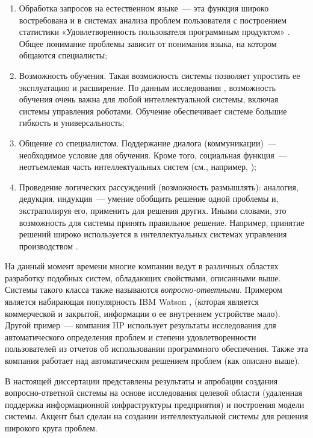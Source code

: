 \begin{enumerate}
  \item Обработка запросов на естественном языке~--- эта функция широко востребована и в системах анализа проблем пользователя с построением статистики «Удовлетворенность пользователя программным продуктом» \cite{TUTUB-1}. Общее понимание проблемы зависит от понимания языка, на котором общаются специалисты;
  \item Возможность обучения. Такая возможность системы позволяет упростить ее эксплуатацию и расширение. По данным исследования \cite{LEARN-1}, возможность обучения очень важна для любой интеллектуальной системы, включая системы управления роботами. Обучение обеспечивает системе большие гибкость и универсальность;
  \item Общение со специалистом. Поддержание диалога (коммуникации)~--- необходимое условие для обучения. Кроме того, социальная функция~--- неотъемлемая часть интеллектуальных систем (см., например, \cite{LEARN-2});
  \item Проведение логических рассуждений (возможность размышлять): аналогия, дедукция, индукция~--- умение обобщить решение одной проблемы и, экстраполируя его, применить для решения других. Иными словами, это возможность для системы принять правильное решение. Например, принятие решений широко используется в интеллектуальных системах управления производством  \cite{LEARN-3}.
\end{enumerate}

На данный момент времени многие компании ведут в различных областях разработку подобных систем, обладающих свойствами, описанными выше. Системы такого класса также называются \textit{вопросно-ответными}. Примером является набирающая популярность IBM Watson \cite{WATSON-PO}, \cite{WATSON-PTOP} (которая является коммерческой и закрытой, информации о ее внутреннем устройстве мало). Другой пример~--- компания HP использует результаты исследования \cite{TUTUB-2} для автоматического определения проблем и степени удовлетворенности пользователей из отчетов об использовании программного обеспечения. Также эта компания работает над автоматическим решением проблем (как описано выше). \par

В настоящей диссертации представлены результаты и апробации создания вопросно-ответной системы на основе исследования целевой области (удаленная поддержка информационной инфраструктуры предприятия) и построения модели системы. Акцент был сделан на создании интеллектуальной системы для решения широкого круга проблем. \par

